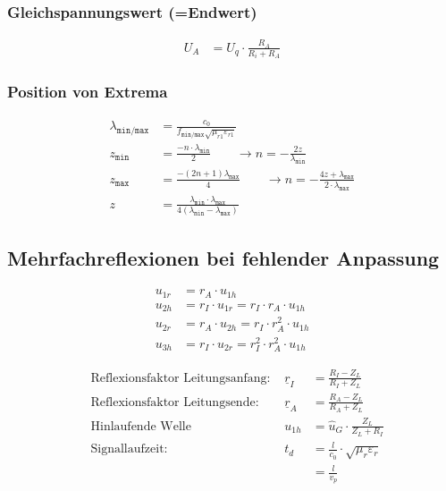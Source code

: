 \subsubsection{Gleichspannungswert (=Endwert)}
\begin{align*}
    U_A & = U_q\cdot\frac{R_A}{R_i+R_A}
\end{align*}

\subsubsection{Position von Extrema}
\begin{align*}
    \lambda_\texttt{min/max}    & = \frac{c_0}{f_\texttt{min/max}\sqrt{\mu_{r1}\varepsilon_{r1}}}\\
    z_\texttt{min}              & =\frac{-n\cdot\lambda_\texttt{min}}{2}                                        \qquad\rightarrow n = -\frac{2z}{\lambda_\texttt{min}}                            \\
    z_\texttt{max}              & =\frac{-(2n+1)\lambda_\texttt{max}}{4}                                        \qquad\rightarrow n = -\frac{4z+\lambda_\texttt{max}}{2\cdot\lambda_\texttt{max}} \\
    z                           & = \frac{\lambda_\texttt{min}\cdot\lambda_\texttt{max}}{4(\lambda_\texttt{min}-\lambda_\texttt{max})}
\end{align*}

\subsection{Mehrfachreflexionen bei fehlender Anpassung}

\begin{align*}
    u_{1r} & = r_A\cdot u_{1h}                                \\
    u_{2h} & = r_I\cdot u_{1r} = r_I\cdot r_A\cdot u_{1h}     \\
    u_{2r} & = r_A\cdot u_{2h} = r_I\cdot r_A^2\cdot u_{1h}   \\
    u_{3h} & = r_I\cdot u_{2r} = r_I^2\cdot r_A^2\cdot u_{1h}
\end{align*}

\begin{align*}
     & \text{Reflexionsfaktor Leitungsanfang: } & \underline{r}_I & = \frac{R_I - Z_L}{R_I + Z_L}                 \\
     & \text{Reflexionsfaktor Leitungsende: }   & \underline{r}_A & = \frac{R_A - Z_L}{R_A + Z_L}                 \\
     & \text{Hinlaufende Welle}                 & u_{1h}          & = \hat{u}_G \cdot\frac{Z_L}{Z_L+R_I}          \\
     & \text{Signallaufzeit: }                  & t_d             & = \frac{l}{c_0}\cdot\sqrt{\mu_r\varepsilon_r} \\
     &                                          &                 & = \frac{l}{v_p}
\end{align*}
